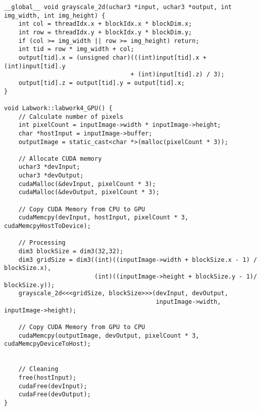 \documentclass[10pt, a4paper]{article}
\begin{document}
\begin{verbatim}
__global__ void grayscale_2d(uchar3 *input, uchar3 *output, int img_width, int img_height) {
    int col = threadIdx.x + blockIdx.x * blockDim.x;
    int row = threadIdx.y + blockIdx.y * blockDim.y;
    if (col >= img_width || row >= img_height) return;
    int tid = row * img_width + col;
    output[tid].x = (unsigned char)(((int)input[tid].x + (int)input[tid].y 
                                   + (int)input[tid].z) / 3);
    output[tid].z = output[tid].y = output[tid].x;
}

void Labwork::labwork4_GPU() {
    // Calculate number of pixels
    int pixelCount = inputImage->width * inputImage->height;
    char *hostInput = inputImage->buffer;
    outputImage = static_cast<char *>(malloc(pixelCount * 3));

    // Allocate CUDA memory    
    uchar3 *devInput;
    uchar3 *devOutput;
    cudaMalloc(&devInput, pixelCount * 3);
    cudaMalloc(&devOutput, pixelCount * 3);
    
    // Copy CUDA Memory from CPU to GPU
    cudaMemcpy(devInput, hostInput, pixelCount * 3, cudaMemcpyHostToDevice);

    // Processing
    dim3 blockSize = dim3(32,32);
    dim3 gridSize = dim3((int)((inputImage->width + blockSize.x - 1) / blockSize.x),
                         (int)((inputImage->height + blockSize.y - 1)/ blockSize.y));
    grayscale_2d<<<gridSize, blockSize>>>(devInput, devOutput, 
                                          inputImage->width, inputImage->height);

    // Copy CUDA Memory from GPU to CPU
    cudaMemcpy(outputImage, devOutput, pixelCount * 3, cudaMemcpyDeviceToHost);


    // Cleaning
    free(hostInput);
    cudaFree(devInput);
    cudaFree(devOutput);
}

\end{verbatim}
\end{document}
